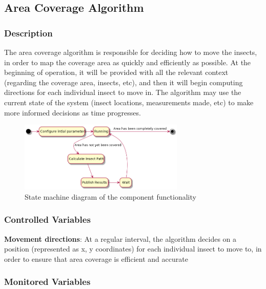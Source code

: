 \documentclass[11pt]{article}
\begin{document}
\subsection{Area Coverage Algorithm}
\subsubsection{Description}
The area coverage algorithm is responsible for deciding how to move the insects, in order to map the coverage area as quickly and
efficiently as possible. At the beginning of operation, it will be provided with all the relevant context (regarding the coverage area,
insects, etc), and then it will begin computing directions for each individual insect to move in. The algorithm may use the current
state of the system (insect locations, measurements made, etc) to make more informed decisions as time progresses.\\

\begin{figure}[H]
   \centering
   \includegraphics[width=0.7\textwidth]{diagram/areacov.png}
   \caption{State machine diagram of the component functionality}
   \label{fig:algorithm-fsm}
\end{figure}

\subsubsection{Controlled Variables}

\textbf{Movement directions}: At a regular interval, the algorithm decides on a position (represented as
x, y coordinates) for each individual insect to move to, in order to ensure that area coverage is efficient and accurate \\

\subsubsection{Monitored Variables}
\end{document}
